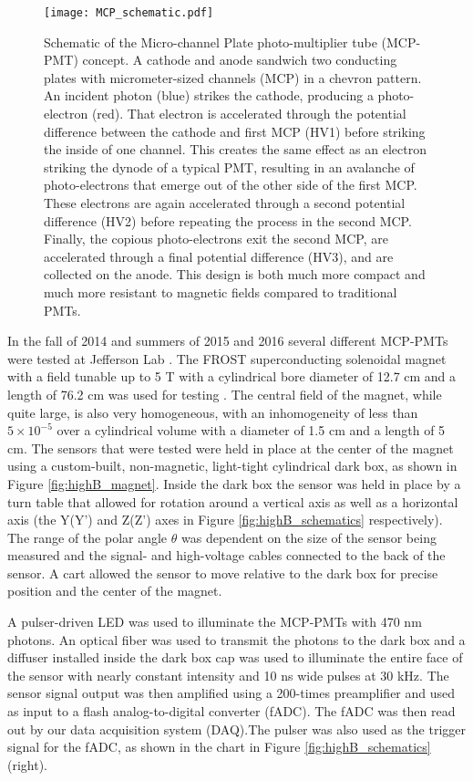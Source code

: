 \begin{figure}[ht]
	\centering
	\texttt{[image: MCP\_schematic.pdf]}
	\caption{Schematic of the Micro-channel Plate photo-multiplier tube (MCP-PMT) concept. A cathode and anode sandwich two conducting plates with micrometer-sized channels (MCP) in a chevron pattern. An incident photon (blue) strikes the cathode, producing a photo-electron (red). That electron is accelerated through the potential difference between the cathode and first MCP (HV1) before striking the inside of one channel. This creates the same effect as an electron striking the dynode of a typical PMT, resulting in an avalanche of photo-electrons that emerge out of the other side of the first MCP. These electrons are again accelerated through a second potential difference (HV2) before repeating the process in the second MCP. Finally, the copious photo-electrons exit the second MCP, are accelerated through a final potential difference (HV3), and are collected on the anode. This design is both much more compact and much more resistant to magnetic fields compared to traditional PMTs.}
	\label{fig:MCP_schematic}
\end{figure}

In the fall of 2014 and summers of 2015 and 2016 several different MCP-PMTs were tested at Jefferson Lab \cite{HighB_DIRC2015}. The FROST  superconducting solenoidal magnet with a field tunable up to 5 T with a cylindrical bore diameter of 12.7 cm and a length of 76.2 cm was used for testing \cite{JLab_FrozenTarget}. The central field of the magnet, while quite large, is also very homogeneous, with an inhomogeneity of less than $5\times10^{-5}$ over a cylindrical volume with a diameter of 1.5 cm and a length of 5 cm. The sensors that were tested were held in place at the center of the magnet using a custom-built, non-magnetic, light-tight cylindrical dark box, as shown in Figure \ref{fig:highB_magnet}. Inside the dark box the sensor was held in place by a turn table that allowed for rotation around a vertical axis as well as a horizontal axis (the Y(Y') and Z(Z') axes in Figure \ref{fig:highB_schematics} respectively). The range of the polar angle $\theta$ was dependent on the size of the sensor being measured and the signal- and high-voltage cables connected to the back of the sensor. A cart allowed the sensor to move relative to the dark box for precise position and the center of the magnet.

A pulser-driven LED was used to illuminate the MCP-PMTs with 470 nm photons. An optical fiber was used to transmit the photons to the dark box and a diffuser installed inside the dark box cap was used to illuminate the entire face of the sensor with nearly constant intensity and 10 ns wide pulses at 30 kHz. The sensor signal output was then amplified using a 200-times preamplifier and used as input to a flash analog-to-digital converter (fADC). The fADC was then read out by our data acquisition system (DAQ).The pulser was also used as the trigger signal for the fADC, as shown in the chart in Figure \ref{fig:highB_schematics} (right).



